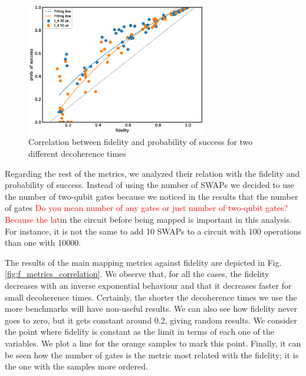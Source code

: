 \begin{figure}[htbp]
\centering
\includegraphics[width=0.7\textwidth]{figures/f_ps_correlation.eps}
\caption{\label{fig:f_ps_correlation_with_meas_error}
Correlation between fidelity and probability of success for two different decoherence times}
\end{figure}



Regarding the rest of the metrics, we analyzed their relation with the fidelity and probability of success.
Instead of using the number of SWAPs we decided to use the number of two-qubit gates because we noticed in the results that the number of gates \textcolor{red}{Do you mean number of any gates or just number of two-qubit gates? Because the lat}in the circuit before being mapped is important in this analysis.
For instance, it is not the same to add 10 SWAPs to a circuit with 100 operations than one with 10000.


The results of the main mapping metrics against fidelity are depicted in Fig. \ref{fig:f_metrics_correlation}.
We observe that, for all the cases, the fidelity decreases with an inverse exponential behaviour and that it decreases faster for small decoherence times.
Certainly, the shorter the decoherence times we use the more benchmarks will have non-useful results.
We can also see how fidelity never goes to zero, but it gets constant around 0.2, giving random results.
We consider the point where fidelity is constant as the limit in terms of each one of the variables.
We plot a line for the orange samples to mark this point.
Finally, it can be seen how the number of gates is the metric most related with the fidelity; it is the one with the samples more ordered.

